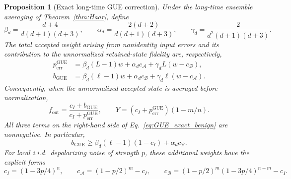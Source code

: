 \documentclass[onecolumn,prx,longbibliography,nofootinbib, superscriptaddress]{revtex4-2}
\newtheorem{proposition}{Proposition}
\theoremstyle{recap}
\begin{document}
\begin{proposition}[Exact long-time GUE correction]\label{prop:GUE_exact_fidelity}
Under the long-time ensemble averaging of Theorem~\ref{thm:Haar}, define
\begin{equation}\label{eq:GUE_transfer_constants}
    \beta_d=\frac{d+4}{d(d+1)(d+3)},\qquad
    \alpha_d=\frac{2(d+2)}{d(d+1)(d+3)},\qquad
    \gamma_d=\frac{2}{d^2(d+1)(d+3)}.
\end{equation}
The total accepted weight arising from nonidentity input errors and its contribution to the unnormalized retained-state fidelity are, respectively,
\begin{align}
    p_{\mathrm{err}}^{\mathrm{GUE}}
    &=\beta_d(L-1)w+\alpha_d c_{\mathcal A}
      +\gamma_d L(w-c_{\mathcal B}),\label{eq:GUE_exact_acceptance}\\
    b_{\mathrm{GUE}}
    &=\beta_d(\ell-1)w+\alpha_d c_{\mathcal B}
      +\gamma_d\ell(w-c_{\mathcal A}).\label{eq:GUE_exact_benign}
\end{align}
Consequently, when the unnormalized accepted state is averaged before normalization,
\begin{equation}\label{eq:GUE_exact_fidelity}
    f_{\mathrm{out}}
    =\frac{c_I+b_{\mathrm{GUE}}}{c_I+p_{\mathrm{err}}^{\mathrm{GUE}}},\qquad
    Y=(c_I+p_{\mathrm{err}}^{\mathrm{GUE}})(1-m/n).
\end{equation}
All three terms on the right-hand side of Eq.~\eqref{eq:GUE_exact_benign} are nonnegative. In particular,
\begin{equation}\label{eq:GUE_explicit_numerator_bound}
    b_{\mathrm{GUE}}\geq
    \beta_d(\ell-1)(1-c_I)+\alpha_d c_{\mathcal B}.
\end{equation}
For local i.i.d.\ depolarizing noise of strength $p$, these additional weights have the explicit forms
\begin{equation}\label{eq:GUE_depolarizing_sums}
    c_I=(1-3p/4)^n,\qquad
    c_{\mathcal A}=(1-p/2)^m-c_I,\qquad
    c_{\mathcal B}=(1-p/2)^m(1-3p/4)^{n-m}-c_I.
\end{equation}
\end{proposition}
\end{document}
